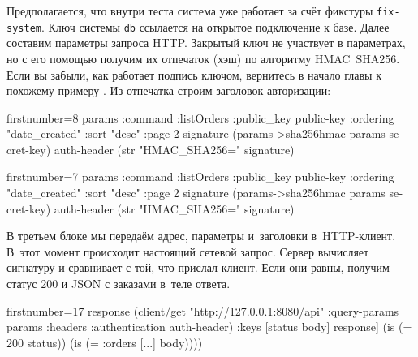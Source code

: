 
\wavebottom

Предполагается, что внутри теста система уже работает за счёт фикстуры
\verb|fix-system|. Ключ системы \verb|db| ссылается на открытое подключение к
базе. Далее составим параметры запроса HTTP. Закрытый ключ не участвует в
параметрах, но с его помощью получим их отпечаток (хэш) по алгоритму
HMAC~SHA256. Если вы забыли, как работает подпись ключом, вернитесь в начало
главы к похожему примеру . Из отпечатка строим заголовок
авторизации:

\wavetop

\ifnarrow

\begin{english}
  \begin{clojure/lines*}{firstnumber=8}
    params {:command :listOrders
            :public_key public-key
            :ordering "date_created"
            :sort "desc"
            :page 2}
    signature (params->sha256hmac
                params secret-key)
    auth-header (str "HMAC_SHA256="
                  signature)
  \end{clojure/lines*}
\end{english}

\else

\begin{english}
  \begin{clojure/lines*}{firstnumber=7}
        params {:command :listOrders
                :public_key public-key
                :ordering "date_created"
                :sort "desc"
                :page 2}
        signature (params->sha256hmac params secret-key)
        auth-header (str "HMAC_SHA256=" signature)
  \end{clojure/lines*}
\end{english}

\fi

\wavebottom

В третьем блоке мы передаём адрес, параметры и~заголовки в~HTTP-клиент. В~этот
момент происходит настоящий сетевой запрос. Сервер вычисляет сигнатуру и
сравнивает с той, что прислал клиент. Если они равны, получим статус 200 и JSON
с заказами в~теле ответа.

\wavetop

\ifnarrow

\begin{english}
  \begin{clojure/lines*}{firstnumber=17}
    response
    (client/get
      "http://127.0.0.1:8080/api"
      {:query-params params
       :headers {:authentication
                 auth-header}})
    {:keys [status body]} response]
(is (= 200 status))
(is (= {:orders [...]} body))))
  \end{clojure/lines*}
\end{english}

